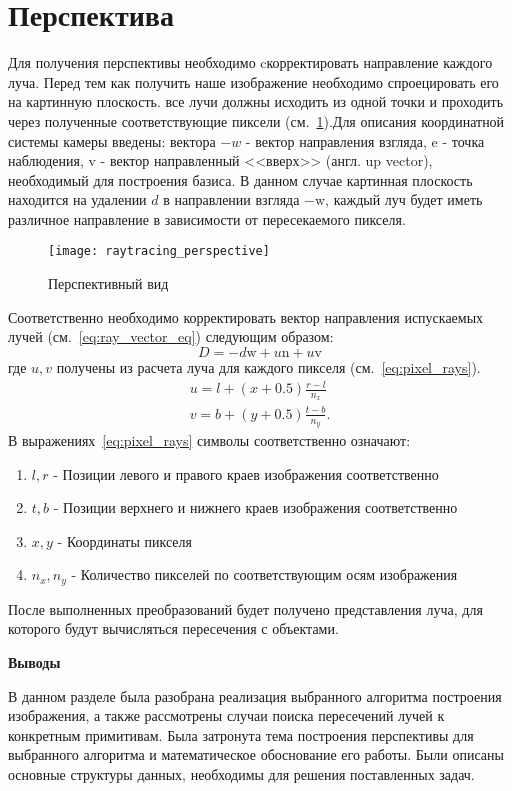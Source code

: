 \section{Перспектива}
Для получения перспективы необходимо cкорректировать направление каждого луча. Перед тем как получить наше изображение необходимо спроецировать его на картинную плоскость.
все лучи должны исходить из одной точки и проходить через полученные соответствующие пиксели (см.~\ref{fig:perspective_view}).Для описания координатной системы камеры введены:
вектора $-w$ - вектор направления взгляда, $\mathrm{e}$ - точка наблюдения, $\mathrm{v}$ - вектор направленный <<вверх>> (англ. up vector), необходимый для построения базиса.
В данном случае картинная плоскость находится на удалении $d$ в направлении взгляда $\mathrm{-w}$, каждый луч будет иметь различное направление в зависимости от пересекаемого пикселя.
\begin{figure}[H]
	\centering
	\texttt{[image: raytracing\_perspective]}
	\caption{Перспективный вид}
	\label{fig:perspective_view}
\end{figure}
Соответственно необходимо корректировать вектор направления испускаемых лучей (см.~\ref{eq:ray_vector_eq}) следующим образом:
\begin{equation}
	D = -d\mathrm{w} + u\mathrm{n} + u\mathrm{v}
\end{equation}
где $u,v$ получены из расчета луча для каждого пикселя (см.~\ref{eq:pixel_rays}).
\begin{equation}
	\begin{aligned}
		u = l + (x + 0.5)\frac{r - l}{n_x}\\
		v = b + (y + 0.5)\frac{t - b}{n_y}.
	\end{aligned}
	\label{eq:pixel_rays}
\end{equation}
В выражениях~\ref{eq:pixel_rays} символы соответственно означают:
\begin{enumerate}
	\item $l,r$ - Позиции левого  и правого краев изображения соответственно
	\item $t,b$ - Позиции верхнего и нижнего краев изображения соответственно
	\item $x,y$ - Координаты пикселя
	\item $n_x,n_y$ - Количество пикселей по соответствующим осям изображения
\end{enumerate}

После выполненных преобразований будет получено представления луча, для которого будут вычисляться
пересечения с объектами.\cite{perspective_raytracing}



\textbf{Выводы}

В данном разделе была разобрана реализация выбранного алгоритма построения изображения, а также рассмотрены случаи поиска пересечений лучей  к конкретным примитивам. 
Была затронута тема построения перспективы для выбранного алгоритма и математическое обоснование его работы. Были описаны основные структуры данных, необходимы для решения поставленных задач.




